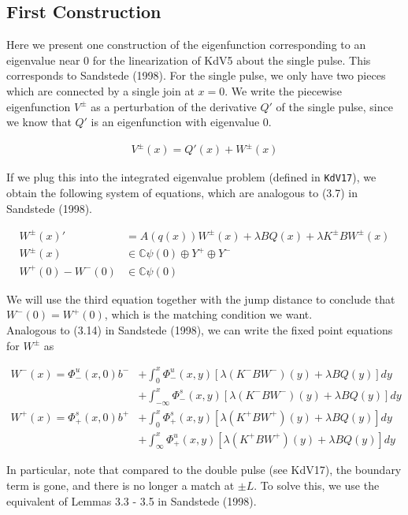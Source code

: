 \documentclass[12pt]{article}
\def\C{{\mathbb C}}
\begin{document}
\subsection*{First Construction}

Here we present one construction of the eigenfunction corresponding to an eigenvalue near 0 for the linearization of KdV5 about the single pulse. This corresponds to Sandstede (1998). For the single pulse, we only have two pieces which are connected by a single join at $x = 0$. We write the piecewise eigenfunction $V^\pm$ as a perturbation of the derivative $Q'$ of the single pulse, since we know that $Q'$ is an eigenfunction with eigenvalue 0. 

\begin{align*}
V^\pm(x) = Q'(x) + W^\pm(x)
\end{align*}

If we plug this into the integrated eigenvalue problem (defined in \texttt{KdV17}), we obtain the following system of equations, which are analogous to (3.7) in Sandstede (1998).

\begin{align*}
W^\pm(x)' &= A(q(x)) W^\pm(x) + \lambda B Q(x) + \lambda K^\pm B W^\pm(x) \\
W^\pm(x) &\in \C \psi(0) \oplus Y^+ \oplus Y^- \\
W^+(0) - W^-(0) &\in \C \psi(0) 
\end{align*}

We will use the third equation together with the jump distance to conclude that $W^-(0) = W^+(0)$, which is the matching condition we want.\\

Analogous to (3.14) in Sandstede (1998), we can write the fixed point equations for $W^\pm$ as

\begin{align*}
W^-(x) = \Phi^u_-(x, 0)b^- &+ \int_0^x \Phi^u_-(x, y)[\lambda (K^- B W^-)(y) + \lambda B Q(y) ] dy \\
&+ \int_{-\infty}^x \Phi^s_-(x, y)[\lambda (K^- B W^-)(y) + \lambda B Q(y) ] dy \\
W^+(x) = \Phi^s_+(x, 0)b^+ &+ \int_0^x \Phi^s_+(x, y)[\lambda (K^+ B W^+)(y) + \lambda B Q(y) ] dy \\
&+ \int_{\infty}^x \Phi^u_+(x, y)[\lambda (K^+ B W^+)(y) + \lambda B Q(y) ] dy
\end{align*}

In particular, note that compared to the double pulse (see \textrm{KdV17}), the boundary term is gone, and there is no longer a match at $\pm L$. To solve this, we use the equivalent of Lemmas 3.3 - 3.5 in Sandstede (1998).
\end{document}

